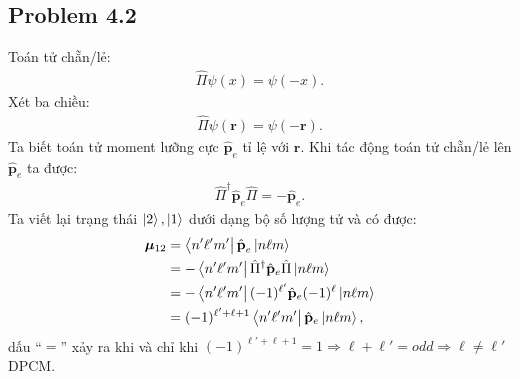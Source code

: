 \documentclass{article}
\renewcommand{\l}{\ell}
\begin{document}
\subsection*{Problem 4.2}
Toán tử chẵn/lẻ:
\begin{align*}
	\hat{\Pi} \psi(x) = \psi(-x).
\end{align*}
Xét ba chiều:
\begin{align*}
	\hat{\Pi} \psi(\mathbf{r}) = \psi(-\mathbf{r}).
\end{align*}
Ta biết toán tử moment lưỡng cực $\hat{\textbf{p}}_e$ tỉ lệ với $\mathbf{r}$. Khi tác động toán tử chẵn/lẻ lên $\hat{\textbf{p}}_e$ ta được:
\begin{align*}
	\hat{\Pi}^{\dagger} \hat{\textbf{p}}_e \hat{\Pi} = - \hat{\textbf{p}}_e.
\end{align*}
Ta viết lại trạng thái $\ket{2},\ket{1}$ dưới dạng bộ số lượng tử và có được:
\begin{align*}
	\boldsymbol{\mu}_{12}
	 & = \bra{n'\l'm'} \hat{\textbf{p}}_e \ket{n\l m}                                   \\
	 & =  - \bra{n'\l'm'}  \hat{\Pi}^{\dagger} \hat{\mathbf{p}}_e \hat{\Pi} \ket{n\l m} \\
	 & =  - \bra{n'\l'm'}  (-1)^{\l'} \hat{\mathbf{p}}_e (-1)^{\l} \ket{n\l m}          \\
	 & =(-1)^{\l' + \l + 1} \bra{n'\l'm'}   \hat{\mathbf{p}}_e \ket{n\l m},
\end{align*}
dấu ``$=$'' xảy ra khi và chỉ khi $ (-1)^{\l' + \l + 1} = 1 \Rightarrow \l + \l' = odd \Rightarrow \l \neq \l'$ DPCM.
\end{document}
